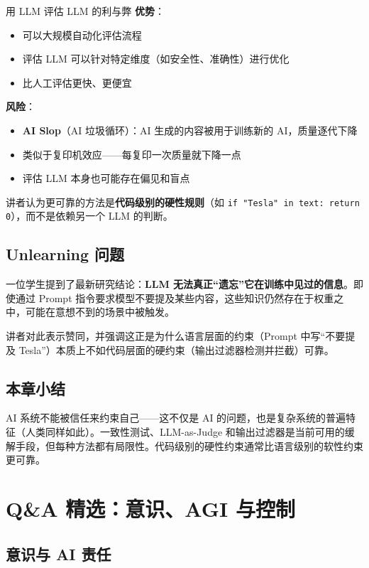 \documentclass[a4paper]{article}
\begin{document}
\begin{knowledgebox}{用 LLM 评估 LLM 的利与弊}
\textbf{优势}：
\begin{itemize}
    \item 可以大规模自动化评估流程
    \item 评估 LLM 可以针对特定维度（如安全性、准确性）进行优化
    \item 比人工评估更快、更便宜
\end{itemize}
\textbf{风险}：
\begin{itemize}
    \item \textbf{AI Slop}（AI 垃圾循环）：AI 生成的内容被用于训练新的 AI，质量逐代下降
    \item 类似于复印机效应——每复印一次质量就下降一点
    \item 评估 LLM 本身也可能存在偏见和盲点
\end{itemize}
讲者认为更可靠的方法是\textbf{代码级别的硬性规则}（如 \texttt{if "Tesla" in text: return 0}），而不是依赖另一个 LLM 的判断。
\end{knowledgebox}

\subsection{Unlearning 问题}

一位学生提到了最新研究结论：\textbf{LLM 无法真正``遗忘''它在训练中见过的信息}。即使通过 Prompt 指令要求模型不要提及某些内容，这些知识仍然存在于权重之中，可能在意想不到的场景中被触发。

讲者对此表示赞同，并强调这正是为什么语言层面的约束（Prompt 中写``不要提及 Tesla''）本质上不如代码层面的硬约束（输出过滤器检测并拦截）可靠。

\subsection{本章小结}

AI 系统不能被信任来约束自己——这不仅是 AI 的问题，也是复杂系统的普遍特征（人类同样如此）。一致性测试、LLM-as-Judge 和输出过滤器是当前可用的缓解手段，但每种方法都有局限性。代码级别的硬性约束通常比语言级别的软性约束更可靠。

\section{Q\&A 精选：意识、AGI 与控制}

\subsection{意识与 AI 责任}
\end{document}
